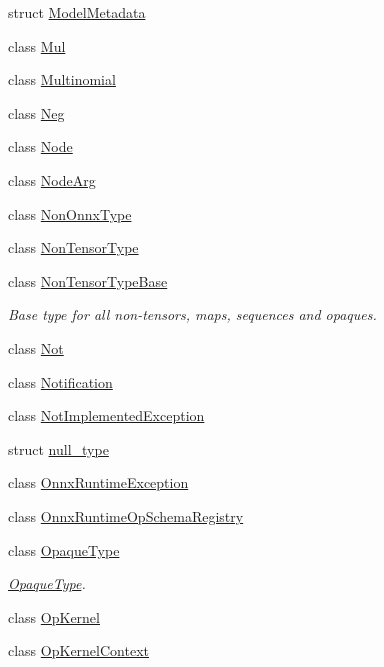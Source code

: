 \begin{DoxyCompactItemize}
\item 
struct \mbox{\hyperlink{structonnxruntime_1_1ModelMetadata}{Model\+Metadata}}
\item 
class \mbox{\hyperlink{classonnxruntime_1_1Mul}{Mul}}
\item 
class \mbox{\hyperlink{classonnxruntime_1_1Multinomial}{Multinomial}}
\item 
class \mbox{\hyperlink{classonnxruntime_1_1Neg}{Neg}}
\item 
class \mbox{\hyperlink{classonnxruntime_1_1Node}{Node}}
\item 
class \mbox{\hyperlink{classonnxruntime_1_1NodeArg}{Node\+Arg}}
\item 
class \mbox{\hyperlink{classonnxruntime_1_1NonOnnxType}{Non\+Onnx\+Type}}
\item 
class \mbox{\hyperlink{classonnxruntime_1_1NonTensorType}{Non\+Tensor\+Type}}
\item 
class \mbox{\hyperlink{classonnxruntime_1_1NonTensorTypeBase}{Non\+Tensor\+Type\+Base}}
\begin{DoxyCompactList}\small\item\em Base type for all non-\/tensors, maps, sequences and opaques. \end{DoxyCompactList}\item 
class \mbox{\hyperlink{classonnxruntime_1_1Not}{Not}}
\item 
class \mbox{\hyperlink{classonnxruntime_1_1Notification}{Notification}}
\item 
class \mbox{\hyperlink{classonnxruntime_1_1NotImplementedException}{Not\+Implemented\+Exception}}
\item 
struct \mbox{\hyperlink{structonnxruntime_1_1null__type}{null\+\_\+type}}
\item 
class \mbox{\hyperlink{classonnxruntime_1_1OnnxRuntimeException}{Onnx\+Runtime\+Exception}}
\item 
class \mbox{\hyperlink{classonnxruntime_1_1OnnxRuntimeOpSchemaRegistry}{Onnx\+Runtime\+Op\+Schema\+Registry}}
\item 
class \mbox{\hyperlink{classonnxruntime_1_1OpaqueType}{Opaque\+Type}}
\begin{DoxyCompactList}\small\item\em \mbox{\hyperlink{classonnxruntime_1_1OpaqueType}{Opaque\+Type}}. \end{DoxyCompactList}\item 
class \mbox{\hyperlink{classonnxruntime_1_1OpKernel}{Op\+Kernel}}
\item 
class \mbox{\hyperlink{classonnxruntime_1_1OpKernelContext}{Op\+Kernel\+Context}}

\end{DoxyCompactItemize}
